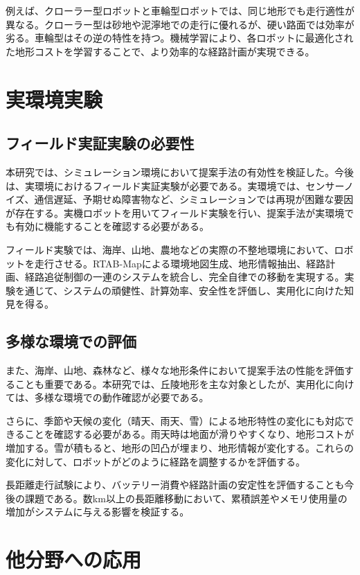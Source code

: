 例えば、クローラー型ロボットと車輪型ロボットでは、同じ地形でも走行適性が異なる。クローラー型は砂地や泥濘地での走行に優れるが、硬い路面では効率が劣る。車輪型はその逆の特性を持つ。機械学習により、各ロボットに最適化された地形コストを学習することで、より効率的な経路計画が実現できる。

\section{実環境実験}

\subsection{フィールド実証実験の必要性}

本研究では、シミュレーション環境において提案手法の有効性を検証した。今後は、実環境におけるフィールド実証実験が必要である。実環境では、センサーノイズ、通信遅延、予期せぬ障害物など、シミュレーションでは再現が困難な要因が存在する。実機ロボットを用いてフィールド実験を行い、提案手法が実環境でも有効に機能することを確認する必要がある。

フィールド実験では、海岸、山地、農地などの実際の不整地環境において、ロボットを走行させる。RTAB-Mapによる環境地図生成、地形情報抽出、経路計画、経路追従制御の一連のシステムを統合し、完全自律での移動を実現する。実験を通じて、システムの頑健性、計算効率、安全性を評価し、実用化に向けた知見を得る。

\subsection{多様な環境での評価}

また、海岸、山地、森林など、様々な地形条件において提案手法の性能を評価することも重要である。本研究では、丘陵地形を主な対象としたが、実用化に向けては、多様な環境での動作確認が必要である。

さらに、季節や天候の変化（晴天、雨天、雪）による地形特性の変化にも対応できることを確認する必要がある。雨天時は地面が滑りやすくなり、地形コストが増加する。雪が積もると、地形の凹凸が埋まり、地形情報が変化する。これらの変化に対して、ロボットがどのように経路を調整するかを評価する。

長距離走行試験により、バッテリー消費や経路計画の安定性を評価することも今後の課題である。数km以上の長距離移動において、累積誤差やメモリ使用量の増加がシステムに与える影響を検証する。

\section{他分野への応用}

